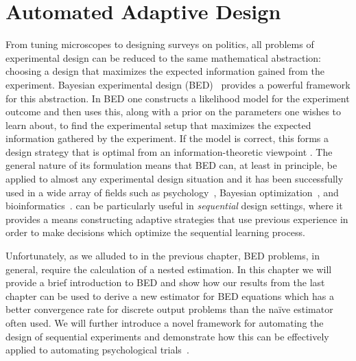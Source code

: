 
\chapter{Automated Adaptive Design}
\label{chp:design}

From tuning microscopes to designing surveys on politics, all problems of 
experimental design can be reduced to the same mathematical abstraction:
choosing a design that maximizes the expected information gained from the 
experiment.
Bayesian experimental design (BED)~\citep{chaloner1995bayesian,sebastiani2000maximum} 
provides a powerful framework for this abstraction.  In BED
one constructs a likelihood model for the experiment outcome and then uses this, along
with a prior on the parameters one wishes to learn about, to find the experimental setup
that maximizes the expected information gathered by the experiment.  
If the model is correct, this forms a design strategy that is optimal from
an information-theoretic viewpoint \citep{sebastiani2000maximum}.  
The general nature of its formulation means that BED can, at least in principle, be applied
to almost any experimental design situation and it has been successfully used in a wide
array of fields such as psychology~\citep{myung2013tutorial,Cavagnaro:discounting,vincent2017darc},
Bayesian optimization~\citep{hennig2012entropy,hernandez2014predictive}, and
bioinformatics~\citep{vanlier2012bayesian}. \Bad can be particularly useful in \emph{sequential}
design settings, where it provides a means constructing adaptive strategies that use
previous experience in order to make decisions which optimize the sequential learning process.

Unfortunately, as we alluded to in the previous chapter, BED problems, in
general,  require the calculation of a nested estimation.
In this chapter we will provide a brief introduction to BED and show how our results
from the last chapter can be used to derive a new estimator for BED equations 
which has a better convergence rate for discrete output problems than the na\"{i}ve
estimator often used.  We will further introduce a novel framework for automating the
design of sequential experiments and demonstrate how this can be
effectively applied to automating psychological trials~\citep{vincent2017darc}.  




